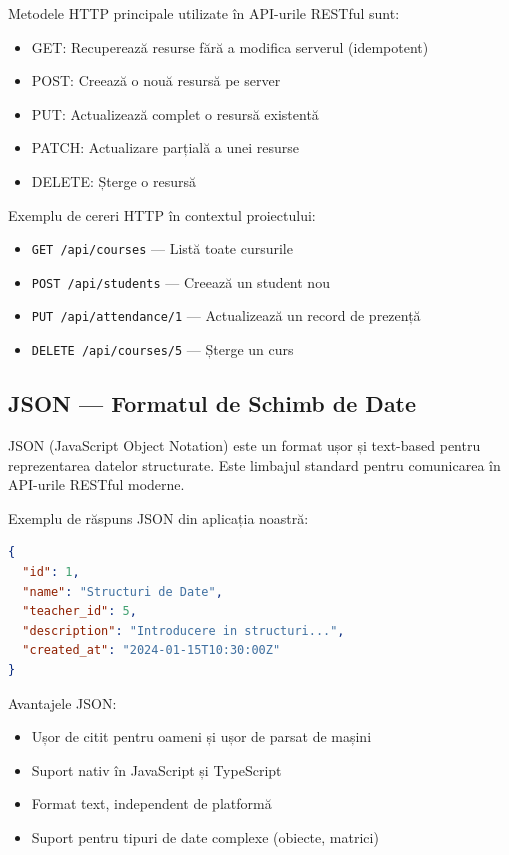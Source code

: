 \documentclass[conference]{IEEEtran}
\begin{document}
Metodele HTTP principale utilizate în API-urile RESTful sunt:

\begin{itemize}
    \item GET: Recuperează resurse fără a modifica serverul (idempotent)
    \item POST: Creează o nouă resursă pe server
    \item PUT: Actualizează complet o resursă existentă
    \item PATCH: Actualizare parțială a unei resurse
    \item DELETE: Șterge o resursă
\end{itemize}

Exemplu de cereri HTTP în contextul proiectului:
\begin{itemize}
    \item \texttt{GET /api/courses} --- Listă toate cursurile
    \item \texttt{POST /api/students} --- Creează un student nou
    \item \texttt{PUT /api/attendance/1} --- Actualizează un record de prezență
    \item \texttt{DELETE /api/courses/5} --- Șterge un curs
\end{itemize}

\subsection{JSON --- Formatul de Schimb de Date}

JSON (JavaScript Object Notation) este un format ușor și text-based pentru
reprezentarea datelor structurate. Este limbajul standard pentru comunicarea în
API-urile RESTful moderne.

Exemplu de răspuns JSON din aplicația noastră:

\begin{lstlisting}[language=json]
{
  "id": 1,
  "name": "Structuri de Date",
  "teacher_id": 5,
  "description": "Introducere in structuri...",
  "created_at": "2024-01-15T10:30:00Z"
}
\end{lstlisting}

Avantajele JSON:
\begin{itemize}
    \item Ușor de citit pentru oameni și ușor de parsat de mașini
    \item Suport nativ în JavaScript și TypeScript
    \item Format text, independent de platformă
    \item Suport pentru tipuri de date complexe (obiecte, matrici)
\end{itemize}
\end{document}
